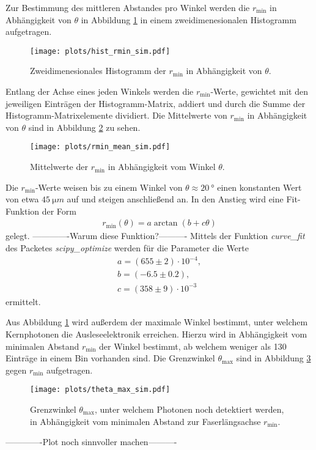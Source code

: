 Zur Bestimmung des mittleren Abstandes pro Winkel werden die $r_{\mathrm{min}}$ in Abhängigkeit von $\theta$ in Abbildung \ref{fig:Hist_rmin_sim} in einem zweidimenesionalen Histogramm aufgetragen.
\begin{figure}
    \centering
    \texttt{[image: plots/hist\_rmin\_sim.pdf]}
    \caption{Zweidimenesionales Histogramm der $r_{\mathrm{min}}$ in Abhängigkeit von $\theta$.}
    \label{fig:Hist_rmin_sim}
\end{figure}
\FloatBarrier
Entlang der Achse eines jeden Winkels werden die $r_{\mathrm{min}}$-Werte, gewichtet mit den jeweiligen Einträgen der Histogramm-Matrix, addiert und durch die Summe der Histogramm-Matrixelemente dividiert. Die Mittelwerte von $r_{\mathrm{min}}$ in Abhängigkeit von $\theta$ sind in Abbildung \ref{fig:rmin_mean_sim} zu sehen.
\begin{figure}
    \centering
    \texttt{[image: plots/rmin\_mean\_sim.pdf]}
    \caption{Mittelwerte der $r_{\mathrm{min}}$ in Abhängigkeit vom Winkel $\theta$. }
    \label{fig:rmin_mean_sim}
\end{figure}
\FloatBarrier
Die $r_{\mathrm{min}}$-Werte weisen bis zu einem Winkel von $\theta \approx \SI{20}{°}$ einen konstanten Wert von etwa $\SI{45}{\micro m}$ auf und steigen anschließend an.
In den Anstieg wird eine Fit-Funktion der Form
\begin{align}
    r_{\mathrm{min}}(\theta) = a \arctan(b + c \theta)
\end{align}
gelegt.
-------------Warum diese Funktion?----------
Mittels der Funktion \textit{curve\_fit} des Packetes \textit{scipy\_optimize} werden für die Parameter die Werte
\begin{align*}
    a = (655 \pm 2)\cdot 10^{-4} ,\\
    b = (-6.5 \pm 0.2),\\
    c = (358 \pm 9)\cdot 10^{-3}
\end{align*}
ermittelt.

Aus Abbildung \ref{fig:Hist_rmin_sim} wird außerdem der maximale Winkel bestimmt, unter welchem Kernphotonen die Ausleseelektronik erreichen. Hierzu wird in Abhängigkeit vom minimalen Abstand $r_{\mathrm{min}}$ der Winkel bestimmt, ab welchem weniger als 130 Einträge in einem Bin vorhanden sind. Die Grenzwinkel $\theta_{\mathrm{max}}$ sind in Abbildung \ref{fig:theta_max_sim} gegen $r_{\mathrm{min}}$ aufgetragen.
\begin{figure}
    \centering
    \texttt{[image: plots/theta\_max\_sim.pdf]}
    \caption{Grenzwinkel $\theta_{\mathrm{max}}$, unter welchem Photonen noch detektiert werden, in Abhängigkeit vom minimalen Abstand zur Faserlängsachse $r_{\mathrm{min}}$. }
    \label{fig:theta_max_sim}
\end{figure}
\FloatBarrier
-------------Plot noch sinnvoller machen----------\\


